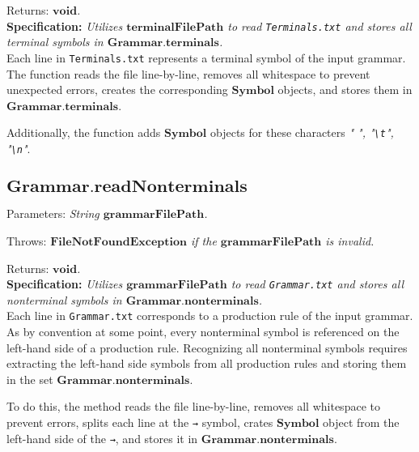 Returns: \textit{\(\boldsymbol{void}\).}\\

\textbf{Specification:} \textit{Utilizes \(\boldsymbol{terminalFilePath}\) to read \texttt{Terminals.txt} and stores all terminal symbols in \(\boldsymbol{Grammar.terminals}\).}\\

Each line in \texttt{Terminals.txt} represents a terminal symbol of the input grammar. The function reads the file line-by-line, removes all whitespace to prevent unexpected errors, creates the corresponding \(\boldsymbol{Symbol}\) objects, and stores them in \(\boldsymbol{Grammar.terminals}\).

Additionally, the function adds \(\boldsymbol{Symbol}\) objects for these characters \textit{" ", "\texttt{\textbackslash t}", "\texttt{\textbackslash n}"}.

\vspace{30pt}

\subsection*{\(\boldsymbol{Grammar.readNonterminals}\)}

Parameters: \textit{String \(\boldsymbol{grammarFilePath}\).}

Throws: \textit{\(\boldsymbol{FileNotFoundException}\) if the \(\boldsymbol{grammarFilePath}\) is invalid.}

Returns: \textit{\(\boldsymbol{void}\).}\\

\textbf{Specification:} \textit{Utilizes \(\boldsymbol{grammarFilePath}\) to read \texttt{Grammar.txt} and stores all nonterminal symbols in \(\boldsymbol{Grammar.nonterminals}\).}\\

Each line in \texttt{Grammar.txt} corresponds to a production rule of the input grammar. As by convention at some point, every nonterminal symbol is referenced on the left-hand side of a production rule. Recognizing all nonterminal symbols requires extracting the left-hand side symbols from all production rules and storing them in the set \(\boldsymbol{Grammar.nonterminals}\).

To do this, the method reads the file line-by-line, removes all whitespace to prevent errors, splits each line at the \texttt{→} symbol, crates \(\boldsymbol{Symbol}\) object from the left-hand side of the \texttt{→}, and stores it in \(\boldsymbol{Grammar.nonterminals}\).

